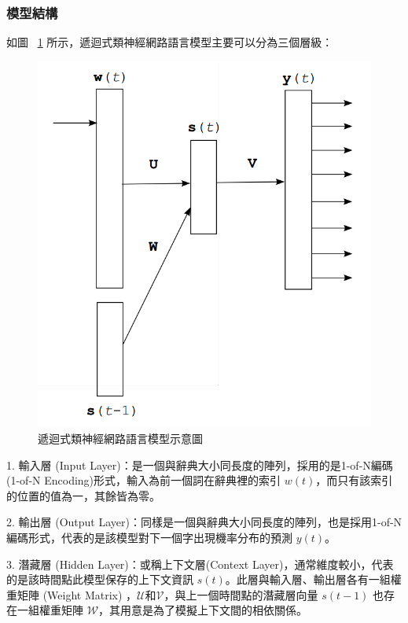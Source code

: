 \subsubsection{模型結構}
如圖 ~\ref{fig:chap5_rnn_structure} 所示，遞迴式類神經網路語言模型主要可以分為三個層級：
\begin{figure}
\centering
\includegraphics[scale=0.3]{images/chap5_rnn_structure.png}
\caption{遞迴式類神經網路語言模型示意圖} \label{fig:chap5_rnn_structure}
\end{figure}


1. 輸入層 (Input Layer)：是一個與辭典大小同長度的陣列，採用的是1-of-N編碼 (1-of-N Encoding)形式，輸入為前一個詞在辭典裡的索引 $w(t)$，而只有該索引的位置的值為一，其餘皆為零。

2. 輸出層 (Output Layer)：同樣是一個與辭典大小同長度的陣列，也是採用1-of-N編碼形式，代表的是該模型對下一個字出現機率分布的預測 $y(t)$。

3. 潛藏層 (Hidden Layer)：或稱上下文層(Context Layer)，通常維度較小，代表的是該時間點此模型保存的上下文資訊 $s(t)$。此層與輸入層、輸出層各有一組權重矩陣 (Weight Matrix) ，$\mathcal{U}$和$\mathcal{V}$，與上一個時間點的潛藏層向量 $s(t-1)$ 也存在一組權重矩陣 $\mathcal{W}$，其用意是為了模擬上下文間的相依關係。


